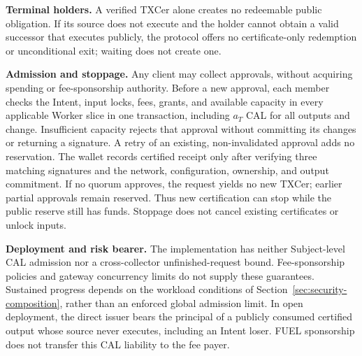 \noindent\textbf{Terminal holders.}
A verified TXCer alone creates no redeemable public obligation. If its source
does not execute and the holder cannot obtain a valid successor that executes
publicly, the protocol offers no certificate-only redemption or unconditional exit;
waiting does not create one.

\noindent\textbf{Admission and stoppage.}
Any client may collect approvals, without acquiring spending or
fee-sponsorship authority. Before a new approval, each member checks
the Intent, input locks, fees, grants, and available capacity in every
applicable Worker slice in one transaction, including $a_T$ CAL for all outputs and change. Insufficient capacity
rejects that approval without committing its changes or returning a
signature. A retry of an existing, non-invalidated approval adds no
reservation. The wallet records certified receipt only after verifying
three matching signatures and the network, configuration, ownership,
and output commitment. If no quorum approves, the request yields no
new TXCer; earlier partial approvals remain reserved. Thus new
certification can stop while the public reserve still has funds.
Stoppage does not cancel existing certificates or unlock inputs.

\noindent\textbf{Deployment and risk bearer.}
The implementation has neither Subject-level CAL admission nor a
cross-collector unfinished-request bound. Fee-sponsorship policies and
gateway concurrency limits do not supply these guarantees. Sustained
progress depends on the workload conditions of
Section~\ref{sec:security-composition}, rather than an enforced global
admission limit. In open deployment, the direct issuer bears the
principal of a publicly consumed certified output whose source never
executes, including an Intent loser. FUEL sponsorship does not transfer
this CAL liability to the fee payer.
